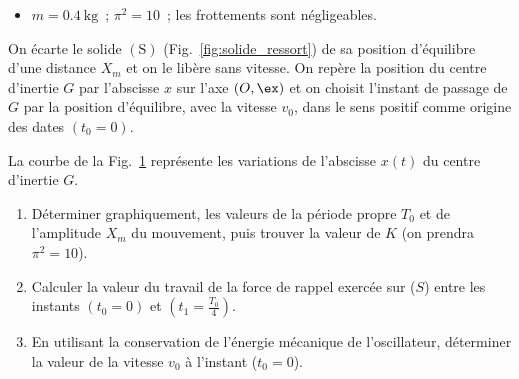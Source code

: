 \begin{donnees}
    \begin{itemize}
        \item $m=\qty{0.4}{\kg}$~; $\pi^{2}=10$~;
              les frottements sont négligeables.
    \end{itemize}
\end{donnees}
On écarte le solide $\mathrm{(S)}$ (Fig.~\ref{fig:solide_ressort}) de sa
position d'équilibre d'une distance $X_{m}$ et on le libère sans vitesse. On
repère la position du centre d'inertie $G$ par l'abscisse $x$ sur l'axe
$(O,\ex)$ et on choisit l'instant de passage de $G$ par la position d'équilibre,
avec la vitesse $v_{0}$, dans le sens positif comme origine des dates
$(t_{0}=0)$.


\begin{minipage}{0.64\linewidth}
    La courbe de la Fig.~\ref{fig:2bac_svt_national_2017_normale_phys_ex3_3}
    représente les variations de l'abscisse $x(t)$ du centre d'inertie $G$.
    \begin{enumerate}
    \item Déterminer graphiquement, les valeurs de la période propre $T_{0}$ et
          de l'amplitude $X_{m}$ du mouvement, puis trouver la valeur de $K$ (on
          prendra $\pi^{2}=10$).
    \item Calculer la valeur du travail de la force de rappel exercée sur ($S$)
          entre les instants $(t_{0}=0)$ et $(t_{1}=\frac{T_{0}}{4})$.
    \item En utilisant la conservation de l'énergie mécanique de l'oscillateur,
          déterminer la valeur de la vitesse $v_{0}$ à l'instant ($t_{0}=0$).
\end{enumerate}
\end{minipage}
\hfill
\begin{minipage}{0.34\linewidth}
\begin{figure}[H]
    \centering
    \caption{}
    \label{fig:2bac_svt_national_2017_normale_phys_ex3_3}
\end{figure}
\end{minipage}

